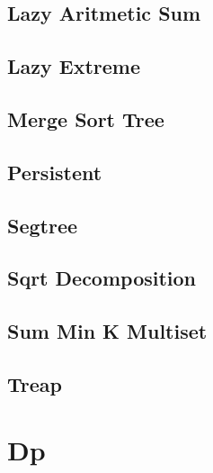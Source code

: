 \documentclass[10pt,landscape,twocolumn,a4paper,notitlepage]{article}
\newcommand\cppfile[2][]{

}
\begin{document}
\subsection{Lazy Aritmetic Sum}
\cppfile{data_structures/segment_tree_recursive/Lazy_Aritmetic_Sum.cpp}

\subsection{Lazy Extreme}
\cppfile{data_structures/segment_tree_recursive/Lazy_Extreme.cpp}

\subsection{Merge Sort Tree}
\cppfile{data_structures/segment_tree_recursive/Merge_Sort_Tree.cpp}

\subsection{Persistent}
\cppfile{data_structures/segment_tree_recursive/persistent.cpp}

\subsection{Segtree}
\cppfile{data_structures/segment_tree_recursive/segtree.cpp}

\newpage

\subsection{Sqrt Decomposition}
\cppfile{data_structures/sqrt_decomposition.cpp}

\subsection{Sum Min K Multiset}
\cppfile{data_structures/sum_min_k_multiset.cpp}

\subsection{Treap}
\cppfile{data_structures/treap.cpp}

\newpage


\section{Dp}
\end{document}
